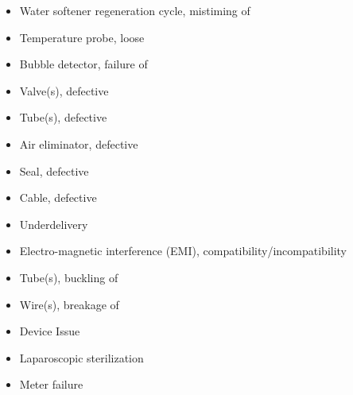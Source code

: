 \documentclass{beamer}
\begin{document}
\begin{frame}
\begin{multicols}{4}
\begin{itemize}
  \item Water softener regeneration cycle, mistiming of
  \item Temperature probe, loose
  \item Bubble detector, failure of
  \item Valve(s), defective
  \item Tube(s), defective
  \item Air eliminator, defective
  \item Seal, defective
  \item Cable, defective
  \item Underdelivery
  \item Electro-magnetic interference (EMI), compatibility/incompatibility
  \item Tube(s), buckling of
  \item Wire(s), breakage of
  \item Device Issue
  \item Laparoscopic sterilization
  \item Meter failure
  \end{itemize}
  \end{multicols}
  \end{frame}
\end{document}
